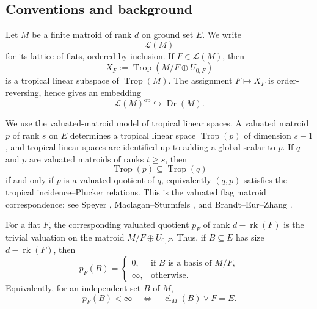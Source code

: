 \documentclass[12pt]{article}
\newcommand{\Trop}{\operatorname{Trop}}
\newcommand{\Dr}{\operatorname{Dr}}
\newcommand{\rk}{\operatorname{rk}}
\newcommand{\cl}{\operatorname{cl}}
\newcommand{\cL}{\mathcal L}
\theoremstyle{plain}
\theoremstyle{definition}
\begin{document}

\date{}


\begin{abstract}
We prove that if the lattice of flats of a finite matroid \(M\) admits an order-reversing involution \(F\mapsto F^\perp\), then the relative Dressian
\[
   \Dr(M)=\{\text{tropical linear subspaces of }\Trop(M)\}
\]
admits an order-reversing involution extending \(F\mapsto F^\perp\) under the natural embedding
\[
   \cL(M)^{\operatorname{op}}\hookrightarrow \Dr(M),\qquad
   F\longmapsto \Trop(M/F\oplus U_{0,F}).
\]
The main point is that an order-reversing involution of a geometric lattice forces the lattice to be modular.  For modular matroids, valuated quotients are naturally valuated matroids on the modular lattice of flats, and the desired involution is obtained by pulling back along the lattice polarity.
\end{abstract}

\subsection{Conventions and background}

Let \(M\) be a finite matroid of rank \(d\) on ground set \(E\).  We write
\[
  \cL(M)
\]
for its lattice of flats, ordered by inclusion.  If \(F\in \cL(M)\), then
\[
  X_F:=\Trop(M/F\oplus U_{0,F})
\]
is a tropical linear subspace of \(\Trop(M)\).  The assignment \(F\mapsto X_F\) is order-reversing, hence gives an embedding
\[
   \cL(M)^{\operatorname{op}}\hookrightarrow \Dr(M).
\]

We use the valuated-matroid model of tropical linear spaces.  A valuated matroid \(p\) of rank \(s\) on \(E\) determines a tropical linear space \(\Trop(p)\) of dimension \(s-1\), and tropical linear spaces are identified up to adding a global scalar to \(p\).  If \(q\) and \(p\) are valuated matroids of ranks \(t\ge s\), then
\[
   \Trop(p)\subseteq \Trop(q)
\]
if and only if \(p\) is a valuated quotient of \(q\), equivalently \((q,p)\) satisfies the tropical incidence--Plucker relations.  This is the valuated flag matroid correspondence; see Speyer \cite{SpeyerTLS}, Maclagan--Sturmfels \cite[Ch.~4]{MS}, and Brandt--Eur--Zhang \cite{BEZ}.

For a flat \(F\), the corresponding valuated quotient \(p_F\) of rank \(d-\rk(F)\) is the trivial valuation on the matroid \(M/F\oplus U_{0,F}\).  Thus, if \(B\subseteq E\) has size \(d-\rk(F)\), then
\[
   p_F(B)=
   \begin{cases}
   0, & \text{if } B \text{ is a basis of }M/F,\\
   \infty, & \text{otherwise}.
   \end{cases}
\]
Equivalently, for an independent set \(B\) of \(M\),
\[
   p_F(B)<\infty
   \quad\Longleftrightarrow\quad
   \cl_M(B)\vee F=E.
\]
\end{document}
